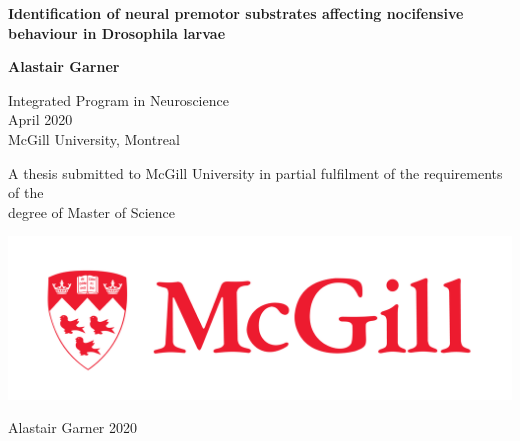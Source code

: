\begin{titlepage}
  \begin{center}
    \vspace*{1cm}

    {\Large\textbf{Identification of neural premotor substrates affecting nocifensive behaviour in Drosophila larvae}\par}

    \vspace{2.0cm}
    
    {\large\textbf{Alastair Garner}\par}

    \vspace{0.5cm}
    
    Integrated Program in Neuroscience\\
    April 2020\\
    McGill University, Montreal\\

    \vfill

    A thesis submitted to McGill University in partial fulfilment of the requirements of the\\
    degree of Master of Science

    \vspace{0.2cm}

    \includegraphics{./mcgill_sig_red.png}

    \textcopyright Alastair Garner 2020
  \end{center} 
\end{titlepage}
